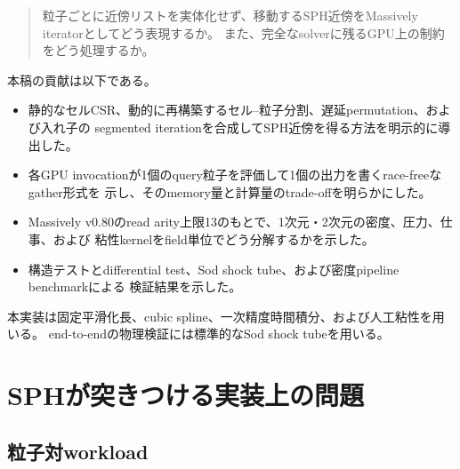 \documentclass[a4paper,10pt]{ltjsarticle}
\begin{document}
\begin{quote}
粒子ごとに近傍リストを実体化せず、移動するSPH近傍をMassively iteratorとしてどう表現するか。
また、完全なsolverに残るGPU上の制約をどう処理するか。
\end{quote}

本稿の貢献は以下である。
\begin{itemize}
  \item 静的なセルCSR、動的に再構築するセル--粒子分割、遅延permutation、および入れ子の
        segmented iterationを合成してSPH近傍を得る方法を明示的に導出した。
  \item 各GPU invocationが1個のquery粒子を評価して1個の出力を書くrace-freeなgather形式を
        示し、そのmemory量と計算量のtrade-offを明らかにした。
  \item Massively v0.80のread arity上限13のもとで、1次元・2次元の密度、圧力、仕事、および
        粘性kernelをfield単位でどう分解するかを示した。
  \item 構造テストとdifferential test、Sod shock tube、および密度pipeline benchmarkによる
        検証結果を示した。
\end{itemize}

本実装は固定平滑化長、cubic spline、一次精度時間積分、および人工粘性を用いる。
end-to-endの物理検証には標準的なSod shock tubeを用いる。

\section{SPHが突きつける実装上の問題}

\subsection{粒子対workload}
\end{document}
